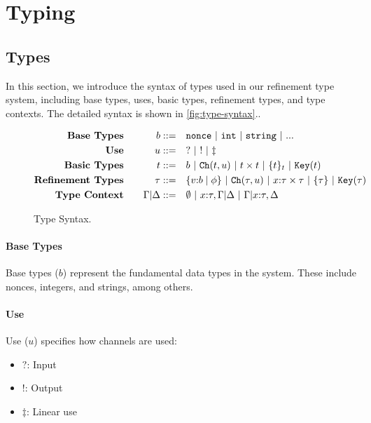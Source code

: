 \documentclass[master,english]{kuisthesis}
\theoremstyle{definition}
\begin{document}
\section{Typing}\label{sec-structure}
\subsection{Types}

In this section, we introduce the syntax of types used in our refinement type system, including base types, uses, basic types, refinement types, and type contexts. The detailed syntax is shown in \autoref{fig:type-syntax}..
\begin{figure}[h!]
\centering
    \begin{alignat*}{2}
    \text{\textbf{Base Types}}& \quad & b ::= \quad & {\tt nonce} ~|~ {\tt int} ~|~ {\tt string} ~|~ ...\\
    \text{\textbf{Use}}& \quad & u ::= \quad & ? ~|~ ! ~|~ \ddagger \\
    \text{\textbf{Basic Types}}& \quad & t ::= \quad & b ~|~  {\tt Ch}({t, u}) ~|~ t \times t ~|~ \{t\}_t ~|~ {\tt Key}({t}) \\
    \text{\textbf{Refinement Types}}& \quad & \tau ::= \quad & \{v{:}{b} \;|\; {\phi}\} ~|~ {\tt Ch}({\tau, u }) ~|~ x{:}\tau \times \tau ~|~ \{\tau\} ~|~ {\tt Key}({\tau})  \\
    \text{\textbf{Type Context}}& \quad & \Gamma|\Delta ::= \quad & \emptyset ~|~ x{:}\tau, \Gamma|\Delta  ~|~  \Gamma|x{:}\tau, \Delta  \\
  \end{alignat*}
    \caption{Type Syntax.}
    \label{fig:type-syntax}
\end{figure}

\paragraph{Base Types}
Base types (\(b\)) represent the fundamental data types in the system. These include nonces, integers, and strings, among others.

\paragraph{Use}
Use (\(u\)) specifies how channels are used:
\begin{itemize}
    \item \(?\): Input
    \item \(!\): Output
    \item \(\ddagger\): Linear use
\end{itemize}
\end{document}
